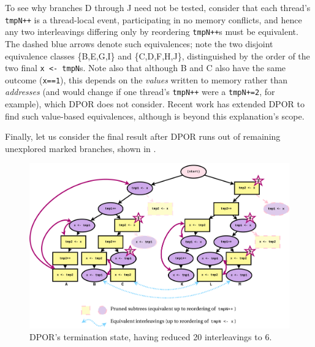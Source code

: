 To see why branches D through J need not be tested, consider that each thread's {\tt tmpN++} is a thread-local event,
participating in no memory conflicts,
and hence any two interleavings differing only by reordering {\tt tmpN++}s must be equivalent.
The dashed blue arrows denote such equivalences;
note the two disjoint equivalence classes \{B,E,G,I\} and \{C,D,F,H,J\},
distinguished by the order of the two final {\tt x~<-~tmpN}s.
Note also that
although B and C also have the same outcome ({\tt x==1}),
this depends on the {\em values} written to memory rather than {\em addresses}
(and would change if one thread's {\tt tmpN++} were a {\tt tmpN+=2}, for example),
which DPOR does not consider.
Recent work \cite{mcr} has extended DPOR to find such value-based equivalences,
although is beyond this explanation's scope.

Finally, let us consider the final result after DPOR runs out of remaining unexplored marked branches,
shown in .

\begin{figure}[h]
	\begin{center}
		\includegraphics[width=\textwidth]{dpor-example-2.pdf}
	\end{center}
	\caption{DPOR's termination state, having reduced 20 interleavings to 6.}
	\label{fig:dpor-example-2}
\end{figure}

